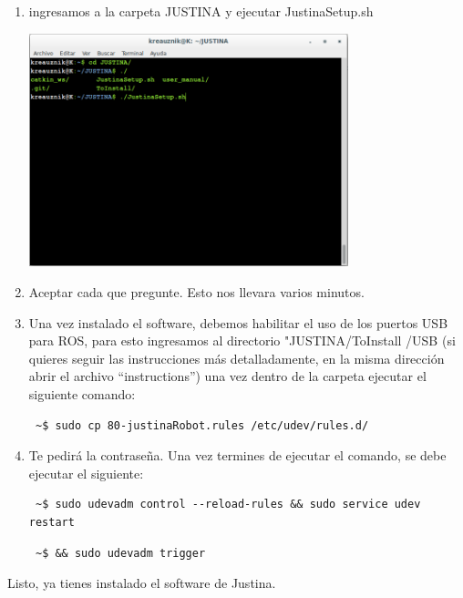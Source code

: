\documentclass[user_manual.tex]{subfiles}
\begin{document}
\begin{enumerate}
 \item ingresamos a la carpeta JUSTINA y ejecutar JustinaSetup.sh
  \begin{center}
\includegraphics[width=0.73\textwidth]{Figures/PP/pp4.png}
\end{center}
 \item Aceptar cada que pregunte. Esto nos llevara varios minutos.
 \item Una vez instalado el software, debemos habilitar el uso de los puertos USB para ROS, para esto ingresamos al directorio "JUSTINA/ToInstall
 /USB (si quieres seguir las instrucciones más detalladamente, en la misma dirección abrir el archivo ``instructions'') una vez dentro
 de la carpeta ejecutar el siguiente comando:

\begin{verbatim}
 ~$ sudo cp 80-justinaRobot.rules /etc/udev/rules.d/
\end{verbatim}
 
 \item Te pedirá la contraseña. Una vez termines de ejecutar el comando, se debe ejecutar el siguiente: 
 
\begin{verbatim}
 ~$ sudo udevadm control --reload-rules && sudo service udev restart
\end{verbatim}
\begin{verbatim}
 ~$ && sudo udevadm trigger
\end{verbatim}
 
\end{enumerate}
Listo, ya tienes instalado el software de Justina.
\end{document}
